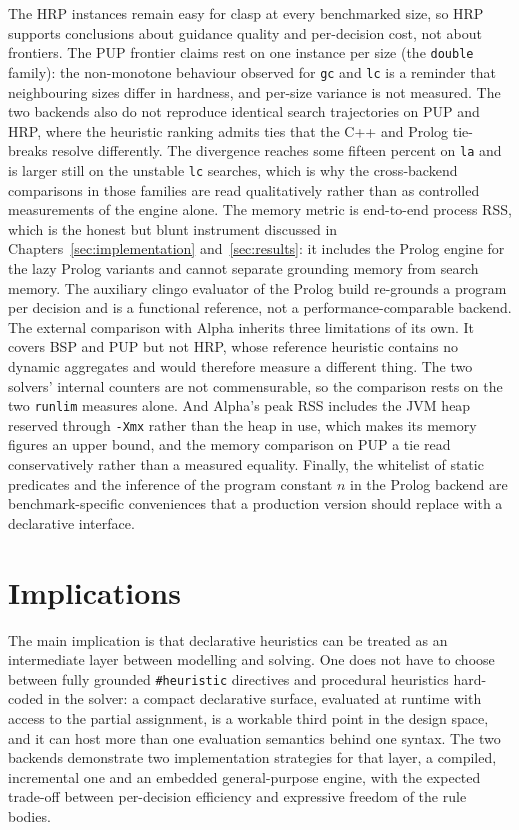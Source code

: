 The HRP instances remain easy for clasp at every benchmarked size, so HRP supports conclusions about guidance quality and per-decision cost, not about frontiers. The PUP frontier claims rest on one instance per size (the \texttt{double} family): the non-monotone behaviour observed for \texttt{gc} and \texttt{lc} is a reminder that neighbouring sizes differ in hardness, and per-size variance is not measured. The two backends also do not reproduce identical search trajectories on PUP and HRP, where the heuristic ranking admits ties that the C++ and Prolog tie-breaks resolve differently. The divergence reaches some fifteen percent on \texttt{la} and is larger still on the unstable \texttt{lc} searches, which is why the cross-backend comparisons in those families are read qualitatively rather than as controlled measurements of the engine alone. The memory metric is end-to-end process RSS, which is the honest but blunt instrument discussed in Chapters~\ref{sec:implementation} and~\ref{sec:results}: it includes the Prolog engine for the lazy Prolog variants and cannot separate grounding memory from search memory. The auxiliary clingo evaluator of the Prolog build re-grounds a program per decision and is a functional reference, not a performance-comparable backend. The external comparison with Alpha inherits three limitations of its own. It covers BSP and PUP but not HRP, whose reference heuristic contains no dynamic aggregates and would therefore measure a different thing. The two solvers' internal counters are not commensurable, so the comparison rests on the two \texttt{runlim} measures alone. And Alpha's peak RSS includes the JVM heap reserved through \texttt{-Xmx} rather than the heap in use, which makes its memory figures an upper bound, and the memory comparison on PUP a tie read conservatively rather than a measured equality. Finally, the whitelist of static predicates and the inference of the program constant $n$ in the Prolog backend are benchmark-specific conveniences that a production version should replace with a declarative interface.

\section{Implications}

The main implication is that declarative heuristics can be treated as an intermediate layer between modelling and solving. One does not have to choose between fully grounded \texttt{\#heuristic} directives and procedural heuristics hard-coded in the solver: a compact declarative surface, evaluated at runtime with access to the partial assignment, is a workable third point in the design space, and it can host more than one evaluation semantics behind one syntax. The two backends demonstrate two implementation strategies for that layer, a compiled, incremental one and an embedded general-purpose engine, with the expected trade-off between per-decision efficiency and expressive freedom of the rule bodies.

